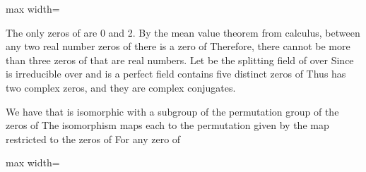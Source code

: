 \documentclass[11pt,oneside]{article}
\begin{document}
\begin{BookBody}
\begin{center}\begin{adjustbox}{max width=\linewidth}\end{adjustbox}\end{center}

\noindent The only zeros of  are 0 and 2. By the mean value theorem from calculus, between any two real number zeros of  there is a zero of  Therefore, there cannot be more than three zeros of  that are real numbers. Let  be the splitting field of  over  Since  is irreducible over  and  is a perfect field contains five distinct zeros of  Thus  has two complex zeros, and they are complex conjugates.

We have that  is isomorphic with a subgroup of the permutation group of the zeros of  The isomorphism maps each \BookInline{\sigma } to the permutation given by the map \BookInline{\sigma } restricted to the zeros of  For any zero  of 

\begin{center}\begin{adjustbox}{max width=\linewidth}\end{adjustbox}\end{center}

\end{BookBody}

\BookNarrativetrue
\end{document}
